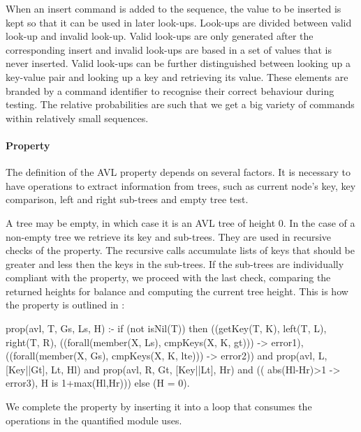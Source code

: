 When an insert command is added to the sequence, the value to be
inserted is kept so that it can be used in later look-ups.
%
Look-ups are divided between valid look-up and invalid look-up.
%
Valid look-ups are only generated after the corresponding insert and
invalid look-ups are based in a set of values that is never inserted.
%
Valid look-ups can be further distinguished between looking up a
key-value pair and looking up a key and retrieving its value.
%
These elements are  branded by a command identifier to recognise their
correct behaviour during testing.
%
The relative probabilities are such that we get a big variety of commands within
relatively small sequences.




\paragraph{\bf Property}


The definition of the AVL property depends on several factors.
%
It is necessary to have operations to extract information from trees,
such as current node's key, key comparison, left and
right sub-trees and empty tree test.


A tree may be empty, in which case it is an AVL tree of height 0.
%
In the case of a non-empty tree we retrieve its key and sub-trees.
%
They are used in recursive checks of the property.
%
The recursive calls accumulate lists of keys that should be greater and
less then the keys in the sub-trees.
%
If the sub-trees are individually compliant with the property, we
proceed with the last check, comparing the returned heights for
balance and computing the current tree height.
%
This is how the property is outlined in \plqc{}:


\begin{yapcode}
prop({avl, T, Gs, Ls, H}) :- if (not isNil(T)) then
 ((getKey(T, K), left(T, L),  right(T, R),
      ((forall(member(X, Ls), cmpKeys(X, K, gt))) -> error1),
      ((forall(member(X, Gs), cmpKeys(X, K, lte))) -> error2))
   and prop({avl, L, [Key||Gt], Lt, Hl})
   and prop({avl, R, Gt, [Key||Lt], Hr})
   and (( abs(Hl-Hr)>1 -> error3), H is 1+max(Hl,Hr)))
 else (H = 0).
\end{yapcode}
%
We complete the property by inserting it into a loop that consumes the
operations in the quantified module uses.




